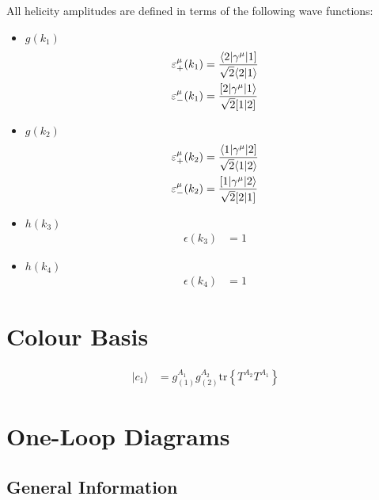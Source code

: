 \documentclass[a4paper]{article}
\newcommand{\Spaa}[1]{\langle #1 \rangle}
\newcommand{\Spab}[1]{\langle #1]}
\newcommand{\Spba}[1]{[ #1 \rangle}
\newcommand{\Spbb}[1]{[ #1 ]}
\begin{document}
All helicity amplitudes are defined in terms of the following wave functions:
\begin{itemize}
\item $g(k_{1})$ 
\begin{align}
\varepsilon^\mu_+(k_{1}) &=
   \frac{\Spab{2\vert\gamma^\mu\vert 1}}{%
   \sqrt{2}\Spaa{2\vert 1}}\\
\varepsilon^\mu_-(k_{1}) &=
   \frac{\Spba{2\vert\gamma^\mu\vert 1}}{%
   \sqrt{2}\Spbb{1\vert 2}}
\end{align}
\item $g(k_{2})$ 
\begin{align}
\varepsilon^\mu_+(k_{2}) &=
   \frac{\Spab{1\vert\gamma^\mu\vert 2}}{%
   \sqrt{2}\Spaa{1\vert 2}}\\
\varepsilon^\mu_-(k_{2}) &=
   \frac{\Spba{1\vert\gamma^\mu\vert 2}}{%
   \sqrt{2}\Spbb{2\vert 1}}
\end{align}
\item $h(k_3)$ 
\begin{align}
\epsilon(k_{3}) &= 1
\end{align}
\item $h(k_4)$ 
\begin{align}
\epsilon(k_{4}) &= 1
\end{align}
\end{itemize}

\section{Colour Basis}
\begin{align}
\vert c_{1}\rangle &=g^{A_{1}}_{(1)}g^{A_{2}}_{(2)}\textrm{tr}\left\{T^{A_{2}}T^{A_{1}}\right\}
\end{align}




\section{One-Loop Diagrams}
\subsection*{General Information}

\end{document}
